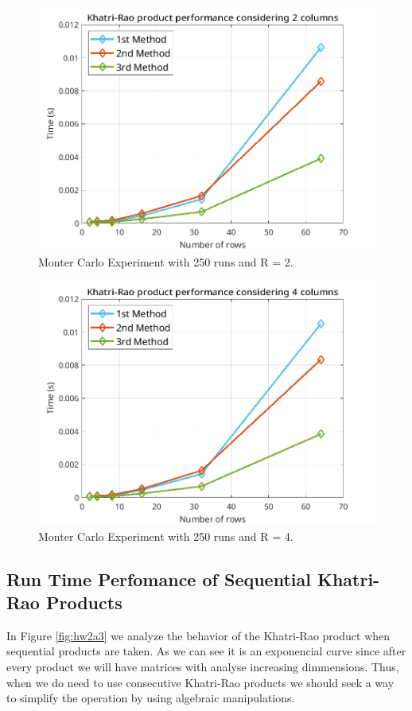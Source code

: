 \documentclass[a4paper,10pt]{article}
\begin{document}
    \begin{figure}[ht!]
        \centering 
        \includegraphics[width=0.75\linewidth]{figs/hw2a1.png} \par 
        \caption{Monter Carlo Experiment with 250 runs and R = 2.}
        \label{fig:hw2a1}
    \end{figure}

    \begin{figure}[ht!]
        \centering 
        \includegraphics[width=0.75\linewidth]{figs/hw2a2.png} \par 
        \caption{Monter Carlo Experiment with 250 runs and R = 4.}
        \label{fig:hw2a2} 
    \end{figure}

    \subsection*{Run Time Perfomance of Sequential Khatri-Rao Products}

    In Figure \ref{fig:hw2a3} we analyze the behavior of the Khatri-Rao product when sequential products are taken. As we can see it is an exponencial curve since after every product we will have matrices with analyse
    increasing dimmensions. Thus, when we do need to use consecutive Khatri-Rao products we should seek a way to simplify the operation by using algebraic manipulations.
\end{document}
